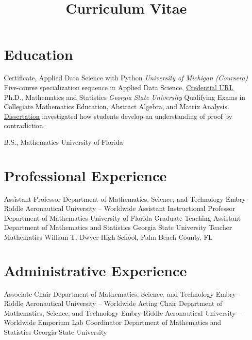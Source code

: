 \documentclass[10pt,a4paper,sans]{moderncv}
\title{Curriculum Vitae}
\begin{document}
\makecvtitle
\vspace*{-1cm}
\section{Education}
{Certificate, Applied Data Science with Python}
{}{}
{\textit{University of Michigan (Coursera)}}
{ Five-course specialization sequence in Applied Data Science. 
	\href{https://www.coursera.org/account/accomplishments/specialization/certificate/7TEVNZ89JDDA}{\underline{Credential URL}}  
}
{}
	{Ph.D., Mathematics and Statistics}
	{}{}
	{\textit{Georgia State University}}
	{Qualifying Exams in Collegiate Mathematics Education, Abstract Algebra, and Matrix Analysis. \\ 
	\href{https://scholarworks.gsu.edu/math_diss/46/}{\underline{Dissertation}} investigated how students develop an understanding of proof by contradiction. 
	}
	{}
	
	{B.S., Mathematics}
	{University of Florida}
	{}{}{}
\section{Professional Experience}
	{Assistant Professor}
	{}
	{Department of Mathematics, Science, and Technology}
	{Embry-Riddle Aeronautical University -- Worldwide}
	{}
	{Assistant Instructional Professor}
	{}
	{Department of Mathematics}
	{University of Florida}
	{}
	{Graduate Teaching Assistant}
	{}
	{Department of Mathematics and Statistics}
	{Georgia State University}
	{}
	{Teacher}
	{}
	{Mathematics}
	{William T. Dwyer High School, Palm Beach County, FL}
	{} 
\section{Administrative Experience}
	{Associate Chair}
	{}
	{Department of Mathematics, Science, and Technology}
	{Embry-Riddle Aeronautical University -- Worldwide}
	{}
	{Acting Chair}
	{}
	{Department of Mathematics, Science, and Technology}
	{Embry-Riddle Aeronautical University -- Worldwide}
	{}
	{Emporium Lab Coordinator}
	{}
	{Department of Mathematics and Statistics}
	{Georgia State University}
	{}
\end{document}
